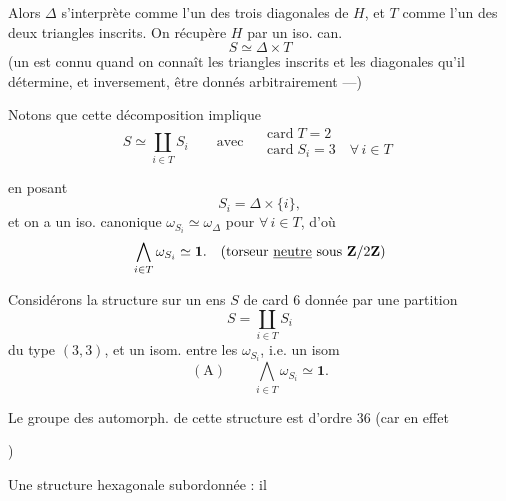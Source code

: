 \documentclass[11pt,a4paper]{article}
\begin{document}
Alors $\Delta$ s'interprète comme l'un des  trois diagonales de
$H$, et $T$ comme l'un des deux triangles inscrits. On récupère $H$ par un
iso. can.
\[
  S \simeq \Delta \times T
\]
(un \ill{} est connu quand on connaît les triangles inscrits et les diagonales
qu'il détermine, et inversement,  être donnés
arbitrairement ---)

Notons que cette décomposition implique
\[
  S \simeq \coprod_{i \in T} S_i \qquad \text{avec}\quad
  \begin{array}{l} \operatorname{card} T = 2 \\
  \operatorname{card} S_i = 3 \quad \forall\, i \in T \end{array}
\]


en posant
\[
  S_i = \Delta \times \{i\},
\]
et on a un iso. canonique $\omega_{S_i} \simeq \omega_\Delta$ pour
$\forall\, i \in T$, d'où
\[
  \bigwedge_{i \in T} \omega_{S_i} \simeq \mathbf{1}.
  \quad (\text{torseur } \uncertain{\text{neutre}} \text{ sous } \mathbf{Z}/2\mathbf{Z})
\]

Considérons la structure  sur un ens $S$ de card $6$ donnée par
une partition
\[
  S = \coprod_{i \in T} S_i
\]
du type $(3,3)$, et un  isom. entre les
$\omega_{S_i}$, i.e.
un isom
\[
  (\mathrm{A}) \qquad \bigwedge_{i \in T} \omega_{S_i} \simeq \mathbf{1}.
\]

 Le groupe des automorph. de cette structure est
d'ordre $36$ (car en effet


)

 Une structure hexagonale subordonnée : il

\end{document}

